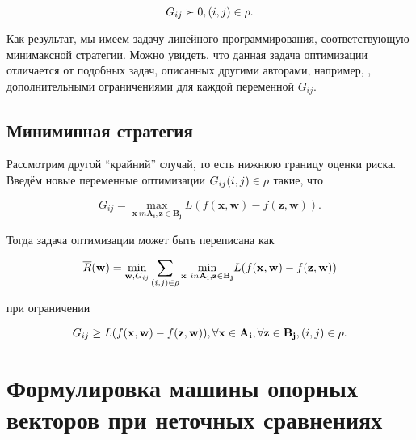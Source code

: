 \documentclass[12pt,a4paper,oneside]{article}
\begin{document}
\[
G_{ij} \succ 0, (i, j) \in \mathrm{\rho}.
\]

\par
Как результат, мы имеем задачу линейного программирования, соответствующую минимаксной стратегии. 
Можно увидеть, что данная задача оптимизации отличается от подобных задач, описанных другими авторами, например, , дополнительными ограничениями для каждой переменной \(G_{ij}\). 


\subsection{Миниминная стратегия}

\par
Рассмотрим другой ``крайний'' случай, то есть нижнюю границу оценки риска. 
Введём новые переменные оптимизации \(G_{ij} (i, j) \in \mathrm{\rho}\) такие, что

\[
G_{ij} = \underset{\mathbf{x} \ in \mathbf{A_i}, \mathbf{z} \in \mathbf{B_j}}{\operatorname{max}} L ( f(\mathbf{x}, \mathbf{w}) - f(\mathbf{z}, \mathbf{w})). 
\]

\par
Тогда задача оптимизации может быть переписана как

\[
\overline{R}(\mathbf{w}) = \underset{\mathbf{w}, G_{ij}}{\operatorname{min}} \sum \limits_{(i, j) \in \mathrm{\rho}} \underset{\mathbf{x} \ in \mathbf{A_i}, \mathbf{z} \in \mathbf{B_j}}{\operatorname{min}} L ( f(\mathbf{x}, \mathbf{w}) - f(\mathbf{z}, \mathbf{w}))
\]

\par
при ограничении

\[
G_{ij} \geq L ( f(\mathbf{x}, \mathbf{w}) - f(\mathbf{z}, \mathbf{w})), \forall \mathbf{x} \in \mathbf{A_i}, \forall \mathbf{z} \in \mathbf{B_j}, (i, j) \in \mathrm{\rho}.
\]


\section{Формулировка машины опорных векторов при неточных сравнениях}
\label{sec:svm_by_imprecise_comparisons}
\end{document}
